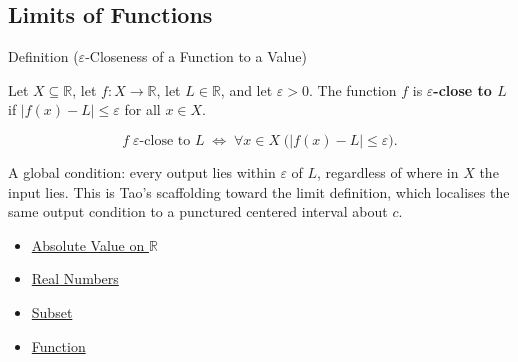 
\subsection*{Limits of Functions}
\label{sec:limits-of-functions}


\begin{definitionbox}{Definition ($\varepsilon$-Closeness of a Function to a Value)}
\begin{definition}
\label{def:eps-close-function}
Let $X \subseteq \mathbb{R}$, let $f : X \to \mathbb{R}$, let
$L \in \mathbb{R}$, and let $\varepsilon > 0$. The function $f$ is
\textbf{$\varepsilon$-close to $L$} if $|f(x)-L|\leq\varepsilon$ for
all $x\in X$.
\end{definition}
\end{definitionbox}

\begin{remark*}
\[
  f \;\varepsilon\text{-close to } L
  \;\iff\;
  \forall x \in X\;\bigl(|f(x)-L|\leq\varepsilon\bigr).
\]
\end{remark*}

\begin{remark*}[Interpretation]
A global condition: every output lies within $\varepsilon$ of $L$,
regardless of where in $X$ the input lies. This is Tao's scaffolding
toward the limit definition, which localises the same output
condition to a punctured centered interval about $c$.
\end{remark*}

\begin{dependencies}
\begin{itemize}
  \item \hyperref[def:real-chapter-absolute-value-on-r]{Absolute Value on $\mathbb{R}$}
  \item \hyperref[def:reals]{Real Numbers}
  \item \hyperref[def:subset]{Subset}
  \item \hyperref[def:function]{Function}
\end{itemize}
\end{dependencies}

